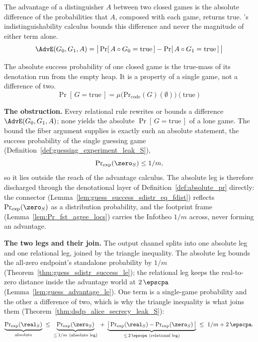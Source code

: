\begin{definition}
  \label{def:relational_advantage}
  \rocqok
  The advantage of a distinguisher $A$ between two closed games is the absolute
  difference of the probabilities that $A$, composed with each game, returns
  true. \ssprove{}'s indistinguishability calculus bounds this difference and
  never the magnitude of either term alone.
  \[ \AdvE(G_0, G_1, A)
        = \bigl|\,\Pr[\,A\circ G_0 = \mathrm{true}\,]
                - \Pr[\,A\circ G_1 = \mathrm{true}\,]\,\bigr| \]
\end{definition}

\begin{definition}
  \label{def:absolute_pr}
  \rocqok
  The absolute success probability of one closed game is the true-mass of its
  denotation run from the empty heap. It is a property of a single game, not a
  difference of two.
  \[ \Pr[\,G = \mathrm{true}\,]
        = \mu\bigl(\mathrm{Pr}_{\mathrm{code}}(G)(\emptyset)\bigr)(\mathrm{true}) \]
\end{definition}

\textbf{The obstruction.} Every relational rule rewrites or bounds a difference
$\AdvE(G_0, G_1, A)$; none yields the absolute $\Pr[\,G = \mathrm{true}\,]$ of a
lone game. The bound the fiber argument supplies is exactly such an absolute
statement, the success probability of the single guessing game
(Definition~\ref{def:guessing_experiment_leak_S}),
\[ \Prexp(\zero_S) \le 1/m, \]
so it lies outside the reach of the advantage calculus. The absolute leg is
therefore discharged through the denotational layer of
Definition~\ref{def:absolute_pr} directly: the connector
(Lemma~\ref{lem:guess_success_sdistr_eq_fdist}) reflects $\Prexp(\zero_S)$ as a
distribution probability, and the footprint frame
(Lemma~\ref{lem:Pr_fst_agree_locs}) carries the Infotheo $1/m$ across, never
forming an advantage.

\textbf{The two legs and their join.} The output channel splits into one
absolute leg and one relational leg, joined by the triangle inequality. The
absolute leg bounds the all-zero endpoint's standalone probability by $1/m$
(Theorem~\ref{thm:guess_sdistr_success_le}); the relational leg keeps
the real-to-zero distance inside the advantage world at $2\,\epscpa$
(Lemma~\ref{lem:guess_advantage_le}). One term is a single-game probability
and the other a difference of two, which is why the triangle inequality is what
joins them (Theorem~\ref{thm:dsdp_alice_secrecy_leak_S}):
\[ \underbrace{\Prexp(\real_S)}_{\text{absolute}}
   \;\le\;
   \underbrace{\Prexp(\zero_S)}_{\le\, 1/m\ \text{(absolute leg)}}
   \;+\;
   \underbrace{\bigl|\,\Prexp(\real_S) - \Prexp(\zero_S)\,\bigr|}
             _{\le\, 2\,\epscpa\ \text{(relational leg)}}
   \;\le\; 1/m + 2\,\epscpa. \]

